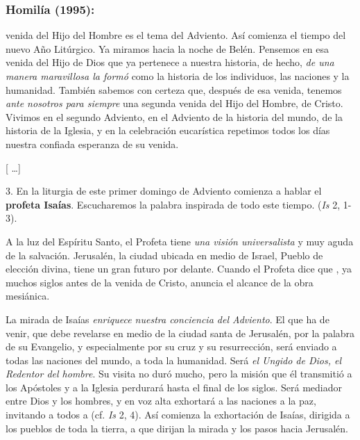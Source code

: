 \subsubsection{Homilía (1995):}


\begin{body}
	 venida del Hijo del Hombre es el tema del Adviento. Así comienza el tiempo del nuevo Año Litúrgico. Ya miramos hacia la noche de Belén. Pensemos en esa venida del Hijo de Dios que ya pertenece a nuestra historia, de hecho, \emph{de una manera maravillosa la formó} como la historia de los individuos, las naciones y la humanidad. También sabemos con certeza que, después de esa venida, tenemos \emph{ante nosotros para siempre} una segunda venida del Hijo del Hombre, de Cristo. Vivimos en el segundo Adviento, en el Adviento de la historia del mundo, de la historia de la Iglesia, y en la celebración eucarística repetimos todos los días nuestra confiada esperanza de su venida.	 
	
	{[} \ldots{}{]} 
	
	3. En la liturgia de este primer domingo de Adviento comienza a hablar el \textbf{profeta Isaías}. Escucharemos la palabra inspirada de todo este tiempo.  (\emph{Is} 2, 1-3). 
	
	A la luz del Espíritu Santo, el Profeta tiene \emph{una visión universalista} y muy aguda de la salvación. Jerusalén, la ciudad ubicada en medio de Israel, Pueblo de elección divina, tiene un gran futuro por delante. Cuando el Profeta dice que , ya muchos siglos antes de la venida de Cristo, anuncia el alcance de la obra mesiánica. 
	
	La mirada de Isaías \emph{enriquece nuestra conciencia del Adviento}. El que ha de venir, que debe revelarse  en medio de la ciudad santa de Jerusalén, por la palabra de su Evangelio, y especialmente por su cruz y su resurrección, será enviado a todas las naciones del mundo, a toda la humanidad. Será \emph{el Ungido de Dios, el Redentor del hombre}. Su visita no duró mucho, pero la misión que él transmitió a los Apóstoles y a la Iglesia perdurará hasta el final de los siglos. Será mediador entre Dios y los hombres, y en voz alta exhortará a las naciones a la paz, invitando a todos a  (cf. \emph{Is} 2, 4). Así comienza la exhortación de Isaías, dirigida a los pueblos de toda la tierra, a que dirijan la mirada y los pasos hacia Jerusalén. 
	

\end{body}
